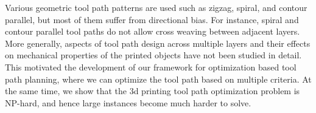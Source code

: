   Various geometric tool path patterns are used such as zigzag, spiral, and contour parallel, but most of them suffer from directional bias.
  For instance, spiral and contour parallel tool paths do not allow cross weaving between adjacent layers.
  More generally, aspects of tool path design across multiple layers and their effects on mechanical properties of the printed objects have not been studied in detail.
  This motivated the development of our framework for optimization based tool path planning, where we can optimize the tool path based on multiple criteria.
  At the same time, we show that the 3d printing tool path optimization problem is NP-hard, and hence large instances become much harder to solve.
